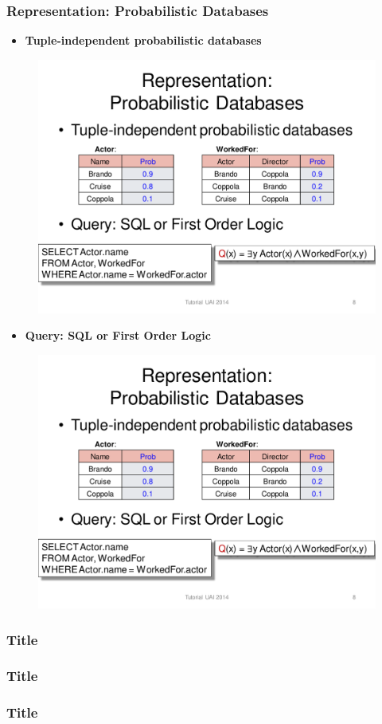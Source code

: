 \documentclass{beamer}
\newcommand{\bi}{\begin{itemize}}
\newcommand{\ei}{\end{itemize}}
\newcommand{\ii}{\item}
\begin{document}
\begin{frame}
\frametitle{Representation: Probabilistic Databases}
\bi
\ii \textbf{Tuple-independent probabilistic databases}
\ei

\begin{figure}[h]
\centering\includegraphics[width=0.91\linewidth]{actor-table.pdf}
\end{figure}

\bi
\ii \textbf{Query: SQL or First Order Logic}
\ei

\begin{figure}[h]
\centering\includegraphics[width=0.91\linewidth]{actor-sql.pdf}
\end{figure}

\end{frame}

\begin{frame}
\frametitle{Title}

\end{frame}

\begin{frame}
\frametitle{Title}

\end{frame}

\begin{frame}
\frametitle{Title}

\end{frame}
\end{document}
